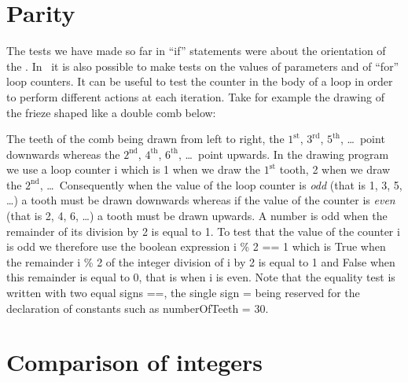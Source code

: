 \section{Parity}
The tests we have made so far in ``if'' statements were about the
orientation of the \robot.  In \python\ it is also
possible to make tests on the values of parameters and of
``for'' loop counters.  It can be useful to test the counter
in the body of a loop in order to perform different actions at
each iteration.  Take for example the drawing of the frieze shaped like a
double comb below:

 {\raggedright
   }

The teeth of the comb being drawn from left to right, the
$1^{\mathrm{st}}$, $3^{\mathrm{rd}}$,
$5^{\mathrm{th}}$, \ldots\ point downwards whereas
the $2^{\mathrm{nd}}$, $4^{\mathrm{th}}$,
$6^{\mathrm{th}}$, \ldots\ point upwards.  In
the drawing program we use a loop counter {\idt i} which
is 1 when we draw the $1^{\mathrm{st}}$ tooth, 2 when we
draw the $2^{\mathrm{nd}}$, \ldots\ Consequently when the
value of the loop counter is {\em odd} (that is 1, 3, 5,
\ldots) a tooth must be drawn downwards whereas if the value
of the counter is {\em even} (that is 2, 4, 6, \ldots) a tooth must be
drawn upwards.  A number is odd
when the remainder of its division by 2 is equal to 1. To test that the
value of the counter {\idt i} is odd we therefore use the boolean
expression {\idt i \% 2 == 1} which is {\mcl True} when the remainder
{\idt i \% 2} of the integer division of {\idt i} by 2 is equal to 1 and
{\mcl False} when this remainder is equal to 0, that is when
{\idt i} is even.  Note that the equality test is written with two
equal signs {\idt ==}, the single sign {\idt =} being reserved for the
declaration of constants such as {\idt numberOfTeeth = 30}.



\section{Comparison of integers}

